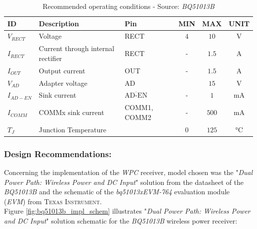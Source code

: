 \documentclass[report.tex]{subfiles}
\begin{document}
\begin{table}[H]
\centering
\begin{tabularx}{\textwidth}{|l|X|l|c|c|c|}\hline
\textbf{ID} & \textbf{Description} & \textbf{Pin} & \textbf{MIN} & \textbf{MAX} & \textbf{UNIT} \\\hline
$V_{RECT}$ & Voltage & RECT & $4$ & $10$ & \si{\volt} \\\hline
$I_{RECT}$ & Current through internal rectifier & RECT & - & $1.5$  & \si{\ampere} \\\hline
$I_{OUT}$ & Output current & OUT & - & $1.5$ & \si{\ampere} \\\hline
$V_{AD}$ & Adapter voltage & AD & & $15$ & \si{\volt} \\\hline
$I_{AD-EN}$ & Sink current & $\overline{\text{AD-EN}}$ & - & $1$ & \si{\milli\ampere} \\\hline
$I_{COMM}$ & COMMx sink current & COMM1, COMM2 & - & $500$ & \si{\milli\ampere} \\\hline
$T_J$ & Junction Temperature & \; & $0$ & $125$ & $\si{\celsius}$ \\\hline
\end{tabularx}
\caption{Recommended operating conditions - Source: \textit{BQ51013B}\cite{BQ51013B}}
\label{tab:bq51013b_recom_oper_cond}
\end{table}

\subsubsection{Design Recommendations:} \label{sec:wpc_rcvr_sel}
Concerning the implementation of the \textit{WPC} receiver, model chosen was the "\textit{Dual Power Path: Wireless Power and DC Input}" solution from the datasheet of the \textit{BQ51013B}\cite{BQ51013B} and the schematic of the \textit{bq51013xEVM-764} evaluation module (\textit{EVM}) from \textsc{Texas Instrument}.\\

Figure \ref{fig:bq51013b_impl_schem} illustrates "\textit{Dual Power Path: Wireless Power and DC Input}" solution schematic for the \textit{BQ51013B} wireless power receiver:
\end{document}
